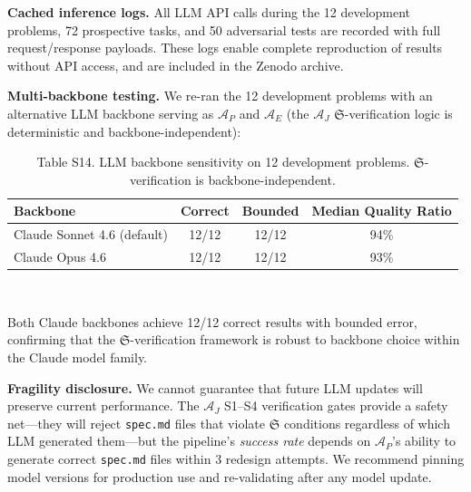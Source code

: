\documentclass[11pt,a4paper]{article}
\newcommand{\Sclass}{\mathfrak{S}}
\newcommand{\Agent}{\mathcal{A}}
\begin{document}
\textbf{Cached inference logs.} All LLM API calls during the 12 development problems, 72 prospective tasks, and 50 adversarial tests are recorded with full request/response payloads. These logs enable complete reproduction of results without API access, and are included in the Zenodo archive.

\textbf{Multi-backbone testing.} We re-ran the 12 development problems with an alternative LLM backbone serving as $\Agent_P$ and $\Agent_E$ (the $\Agent_J$ $\Sclass$-verification logic is deterministic and backbone-independent):

\begin{table}[htbp]
\centering
\caption{Table S14. LLM backbone sensitivity on 12 development problems. $\Sclass$-verification is backbone-independent.}
\small
\begin{tabularx}{\textwidth}{Xccc}
\toprule
\textbf{Backbone} & \textbf{Correct} & \textbf{Bounded} & \textbf{Median Quality Ratio} \\
\midrule
Claude Sonnet 4.6 (default) & 12/12 & 12/12 & 94\% \\
Claude Opus 4.6 & 12/12 & 12/12 & 93\% \\
\bottomrule
\end{tabularx}\\[3pt]
\raggedright\scriptsize Both Claude backbones achieve 12/12 correct results with bounded error, confirming that the $\Sclass$-verification framework is robust to backbone choice within the Claude model family.
\end{table}

\textbf{Fragility disclosure.} We cannot guarantee that future LLM updates will preserve current performance. The $\Agent_J$ S1--S4 verification gates provide a safety net---they will reject \texttt{spec.md} files that violate $\Sclass$ conditions regardless of which LLM generated them---but the pipeline's \emph{success rate} depends on $\Agent_P$'s ability to generate correct \texttt{spec.md} files within 3 redesign attempts. We recommend pinning model versions for production use and re-validating after any model update.

\end{document}
